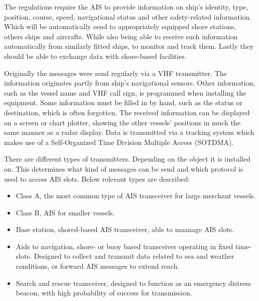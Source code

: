 The regulations require the \ac{AIS} to provide information on ship's identity, type, position, course, speed, navigational status and other safety-related information. Which will be automatically send to appropriately equipped shore stations, others ships and aircrafts. While also being able to receive such information automatically from similarly fitted ships, to monitor and track them. Lastly they should be able to exchange data with shore-based facilities. 

Originally the messages were send regularly via a \ac{VHF} transmitter. The information originates partly from ship's navigational sensors. Other information, such as the vessel name and \ac{VHF} call sign, is programmed when installing the equipment. Some information must be filled in by hand, such as the status or destination, which is often forgotten. The received information can be displayed on a screen or chart plotter, showing the other vessels' positions in much the same manner as a radar display. Data is transmitted via a tracking system which makes use of a Self-Organized Time Division Multiple Access (SOTDMA).

There are different types of transmitters. Depending on the object it is installed on. This determines what kind of messages can be send and which protocol is used to access \ac{AIS} slots. Below relevant types are described:
\begin{itemize}
	\item Class A, the most common type of \ac{AIS} transceiver for large merchant vessels.
	\item Class B, \ac{AIS} for smaller vessels.
	\item Base station, shored-based \ac{AIS} transceiver, able to maanage \ac{AIS} slots.
	\item Aids to navigation, shore- or buoy based transceiver operating in fixed time-slots. Designed to collect and transmit data related to sea and weather conditions, or forward \ac{AIS} messages to extend reach.
	\item Search and rescue transceiver, designed to function as an emergency distress beacon, with high probability of success for transmission.
\end{itemize}

